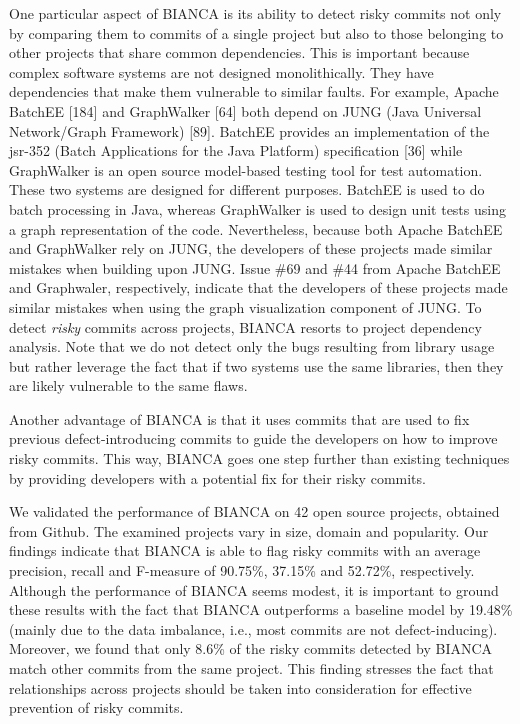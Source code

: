 \documentclass[12pt]{report}
\begin{document}
One particular aspect of BIANCA is its ability to detect risky commits
not only by comparing them to commits of a single project but also to
those belonging to other projects that share common dependencies. This
is important because complex software systems are not designed
monolithically. They have dependencies that make them vulnerable to
similar faults. For example, Apache BatchEE {[}184{]} and GraphWalker
{[}64{]} both depend on JUNG (Java Universal Network/Graph Framework)
{[}89{]}. BatchEE provides an implementation of the jsr-352 (Batch
Applications for the Java Platform) specification {[}36{]} while
GraphWalker is an open source model-based testing tool for test
automation. These two systems are designed for different purposes.
BatchEE is used to do batch processing in Java, whereas GraphWalker is
used to design unit tests using a graph representation of the code.
Nevertheless, because both Apache BatchEE and GraphWalker rely on JUNG,
the developers of these projects made similar mistakes when building
upon JUNG. Issue \#69 and \#44 from Apache BatchEE and Graphwaler,
respectively, indicate that the developers of these projects made
similar mistakes when using the graph visualization component of JUNG.
To detect \emph{risky} commits across projects, BIANCA resorts to
project dependency analysis. Note that we do not detect only the bugs
resulting from library usage but rather leverage the fact that if two
systems use the same libraries, then they are likely vulnerable to the
same flaws.

Another advantage of BIANCA is that it uses commits that are used to fix
previous defect-introducing commits to guide the developers on how to
improve risky commits. This way, BIANCA goes one step further than
existing techniques by providing developers with a potential fix for
their risky commits.

We validated the performance of BIANCA on 42 open source projects,
obtained from Github. The examined projects vary in size, domain and
popularity. Our findings indicate that BIANCA is able to flag risky
commits with an average precision, recall and F-measure of 90.75\%,
37.15\% and 52.72\%, respectively. Although the performance of BIANCA
seems modest, it is important to ground these results with the fact that
BIANCA outperforms a baseline model by 19.48\% (mainly due to the data
imbalance, i.e., most commits are not defect-inducing). Moreover, we
found that only 8.6\% of the risky commits detected by BIANCA match
other commits from the same project. This finding stresses the fact that
relationships across projects should be taken into consideration for
effective prevention of risky commits.
\end{document}
